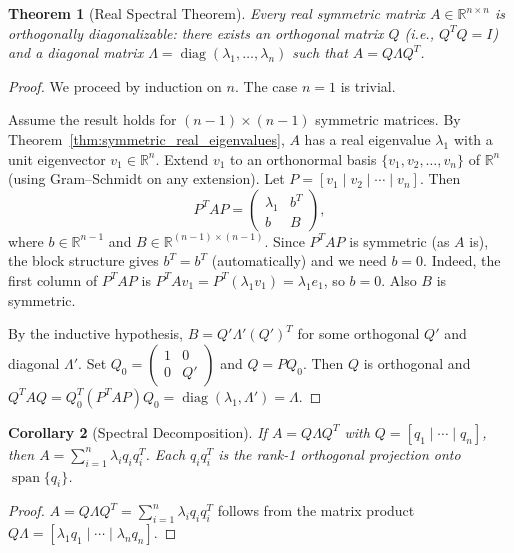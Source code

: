 \documentclass[11pt,a4paper]{article}
\theoremstyle{definition}
\theoremstyle{plain}
\newtheorem{theorem}{Theorem}[section]
\newtheorem{corollary}[theorem]{Corollary}
\theoremstyle{remark}
\newcommand{\R}{\mathbb{R}}
\DeclareMathOperator{\diag}{diag}
\DeclareMathOperator{\Span}{span}
\begin{document}
\begin{theorem}[Real Spectral Theorem]
\label{thm:spectral}
Every real symmetric matrix $A \in \R^{n \times n}$ is orthogonally diagonalizable:
there exists an orthogonal matrix $Q$ (i.e., $Q^T Q = I$) and a diagonal matrix
$\Lambda = \diag(\lambda_1, \ldots, \lambda_n)$ such that $A = Q\Lambda Q^T$.
\end{theorem}

\begin{proof}
We proceed by induction on $n$. The case $n = 1$ is trivial.

Assume the result holds for $(n-1) \times (n-1)$ symmetric matrices. By
Theorem~\ref{thm:symmetric_real_eigenvalues}, $A$ has a real eigenvalue $\lambda_1$ with
a unit eigenvector $v_1 \in \R^n$. Extend $v_1$ to an orthonormal basis
$\{v_1, v_2, \ldots, v_n\}$ of $\R^n$ (using Gram--Schmidt on any extension).
Let $P = [v_1 \mid v_2 \mid \cdots \mid v_n]$. Then
\[
    P^T A P = \begin{pmatrix} \lambda_1 & b^T \\ b & B \end{pmatrix},
\]
where $b \in \R^{n-1}$ and $B \in \R^{(n-1) \times (n-1)}$. Since $P^TAP$ is symmetric
(as $A$ is), the block structure gives $b^T = b^T$ (automatically) and we need $b = 0$.
Indeed, the first column of $P^TAP$ is $P^TAv_1 = P^T(\lambda_1 v_1) = \lambda_1 e_1$,
so $b = 0$. Also $B$ is symmetric.

By the inductive hypothesis, $B = Q' \Lambda' (Q')^T$ for some orthogonal $Q'$ and diagonal
$\Lambda'$. Set $Q_0 = \begin{pmatrix} 1 & 0 \\ 0 & Q' \end{pmatrix}$ and
$Q = PQ_0$. Then $Q$ is orthogonal and
$Q^T A Q = Q_0^T (P^T A P) Q_0 = \diag(\lambda_1, \Lambda') = \Lambda$.
\end{proof}

\begin{corollary}[Spectral Decomposition]
\label{cor:spectral_decomp}
If $A = Q\Lambda Q^T$ with $Q = [q_1 \mid \cdots \mid q_n]$, then
$A = \sum_{i=1}^n \lambda_i q_i q_i^T$. Each $q_i q_i^T$ is the rank-1 orthogonal
projection onto $\Span\{q_i\}$.
\end{corollary}

\begin{proof}
$A = Q\Lambda Q^T = \sum_{i=1}^n \lambda_i q_i q_i^T$ follows from the matrix product
$Q\Lambda = [\lambda_1 q_1 \mid \cdots \mid \lambda_n q_n]$.
\end{proof}
\end{document}
